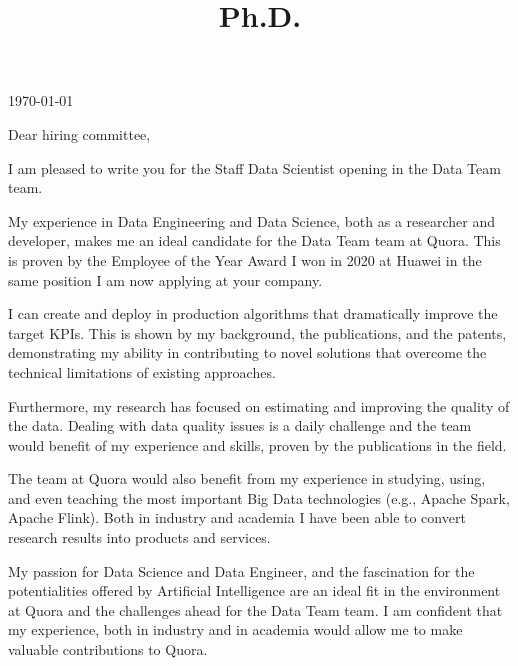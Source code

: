 \documentclass[11pt,a4paper,colorlinks,linkcolor=true]{moderncv}
\title{Ph.D.}
\newcommand{\positionname}{Staff Data Scientist}
\newcommand{\teamname}{Data Team}
\newcommand{\companyname}{Quora}
\begin{document}
\hypersetup{urlcolor=color1}

\makecvtitle
\pagestyle{empty} %

\begin{flushright}
\mydate
\today
\end{flushright}

\vspace*{5mm}

Dear hiring committee,

\vspace*{5mm}

I am pleased to write you for the \positionname{} opening in the \teamname{} team.

\vspace*{3mm}

My experience in Data Engineering and Data Science, both as a researcher and developer, makes me an ideal candidate for the \teamname{} team at \companyname{}. This is proven by the Employee of the Year Award I won in 2020 at Huawei in the same position I am now applying at your company.

\vspace*{3mm}

I can create and deploy in production algorithms that dramatically improve the target KPIs. This is shown by my background, the publications, and the patents, demonstrating my ability in contributing to novel solutions that overcome the technical limitations of existing approaches.

\vspace*{3mm}

Furthermore, my research has focused on estimating and improving the quality of the data. Dealing with data quality issues is a daily challenge and the team would benefit of my experience and skills, proven by the publications in the field.

\vspace*{3mm}

The team at \companyname{} would also benefit from my experience in studying, using, and even teaching the most important Big Data technologies (e.g., Apache Spark, Apache Flink). Both in industry and academia I have been able to convert research results into products and services.

\vspace*{3mm}

My passion for Data Science and Data Engineer, and the fascination for the potentialities offered by Artificial Intelligence are an ideal fit in the environment at \companyname{} and the challenges ahead for the \teamname{} team. I am confident that my experience, both in industry and in academia would allow me to make valuable contributions to \companyname{}.
\end{document}
